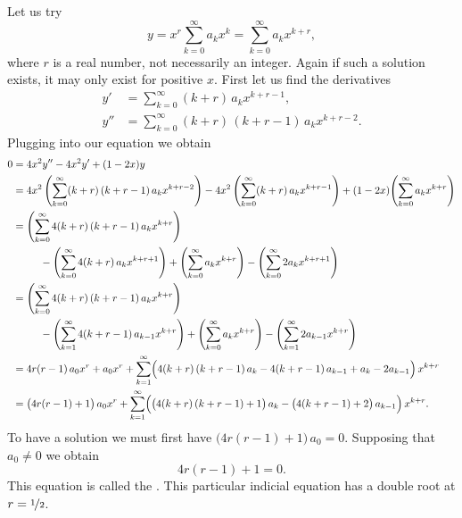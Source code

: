 \documentclass{ximera}
\begin{document}
\begin{exampleSol}
    Let us try
    \begin{equation*}
        y = x^r \sum_{k=0}^\infty a_k x^k = \sum_{k=0}^\infty a_k x^{k+r} ,
    \end{equation*}
    where $r$ is a real number, not necessarily an integer. Again if such a solution exists, it may only exist for positive $x$. First let us find the derivatives
    \begin{align*}
        y' & = \sum_{k=0}^\infty (k+r)\, a_k x^{k+r-1} , \\
        y'' & = \sum_{k=0}^\infty (k+r)\,(k+r-1)\, a_k x^{k+r-2} .
    \end{align*}
    Plugging into our equation we obtain
    \begin{equation*}
        \begin{split}
            0 & = 4x^2y''-4x^2y'+(1-2x)y \\
            &= 4x^2 \, \Biggl( \sum_{k=0}^\infty (k+r)\,(k+r-1) \, a_k x^{k+r-2}  \Biggr) - 4x^2 \, 
            \Biggl( \sum_{k=0}^\infty (k+r) \, a_k x^{k+r-1}  \Biggr) + (1-2x) \Biggl( \sum_{k=0}^\infty a_k x^{k+r} \Biggr) \\
            &= \Biggl( \sum_{k=0}^\infty 4 (k+r)\,(k+r-1) \, a_k x^{k+r}  \Biggr) \\
            & \phantom{mmm} - \Biggl( \sum_{k=0}^\infty 4 (k+r) \, a_k x^{k+r+1}  \Biggr) 
            + \Biggl( \sum_{k=0}^\infty a_k x^{k+r} \Biggr) - \Biggl( \sum_{k=0}^\infty 2a_k x^{k+r+1} \Biggr)\\
            &= \Biggl( \sum_{k=0}^\infty 4 (k+r)\,(k+r-1) \, a_k x^{k+r}  \Biggr) \\
            & \phantom{mmm} - \Biggl( \sum_{k=1}^\infty 4 (k+r-1) \, a_{k-1} x^{k+r}  \Biggr) +
            \Biggl( \sum_{k=0}^\infty a_k x^{k+r} \Biggr) - \Biggl( \sum_{k=1}^\infty 2a_{k-1} x^{k+r} \Biggr) \\
            &= 4r(r-1) \, a_0 x^r  + a_0 x^r +  \sum_{k=1}^\infty \Bigl( 4 (k+r)\,(k+r-1) \, a_k
            - 4 (k+r-1) \, a_{k-1} + a_k - 2a_{k-1} \Bigr) \, x^{k+r}  \\
            &= \bigl( 4r(r-1) + 1 \bigr) \, a_0 x^r +  \sum_{k=1}^\infty \Bigl( \bigl( 4 (k+r)\,(k+r-1) + 1 \bigr) \, a_k - 
            \bigl( 4 (k+r-1) + 2 \bigr) \, a_{k-1} \Bigr) \, x^{k+r} .
        \end{split}
    \end{equation*}
    To have a solution we must first have $\bigl( 4r(r-1) + 1 \bigr) \, a_0 = 0$.  Supposing that $a_0 \not= 0$ we obtain 
    \begin{equation*}
        4r(r-1) + 1 = 0 .
    \end{equation*}
    This equation is called the \emph{}. This particular indicial equation has a double root at $r = \nicefrac{1}{2}$.
    

\end{exampleSol}
\end{document}
